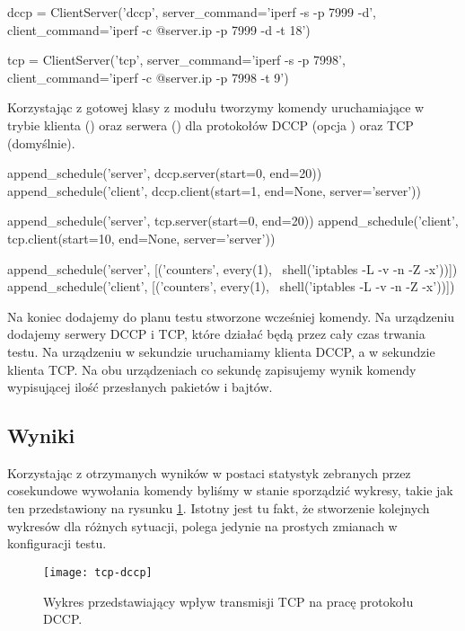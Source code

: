\documentclass[00-praca-magisterska.tex]{subfiles}
\begin{document}
\begin{pythoncode}
  dccp = ClientServer('dccp',
      server_command='iperf -s -p 7999 -d',
      client_command='iperf -c @{server.ip} -p 7999 -d -t 18')

  tcp = ClientServer('tcp',
      server_command='iperf -s -p 7998',
      client_command='iperf -c @{server.ip} -p 7998 -t 9')
\end{pythoncode}

Korzystając z gotowej klasy  z modułu  tworzymy
komendy uruchamiające  w trybie klienta () oraz serwera
() dla protokołów DCCP (opcja ) oraz TCP (domyślnie).

\begin{pythoncode}
  append_schedule('server', dccp.server(start=0, end=20))
  append_schedule('client', dccp.client(start=1, end=None, server='server'))

  append_schedule('server', tcp.server(start=0, end=20))
  append_schedule('client', tcp.client(start=10, end=None, server='server'))

  append_schedule('server', [('counters', every(1), \
      shell('iptables -L -v -n -Z -x'))])
  append_schedule('client', [('counters', every(1), \
      shell('iptables -L -v -n -Z -x'))])
\end{pythoncode}

Na koniec dodajemy do planu testu stworzone wcześniej komendy. Na urządzeniu
 dodajemy serwery DCCP i TCP, które działać będą przez cały czas
trwania testu. Na urządzeniu \code{client} w \code{1} sekundzie uruchamiamy
klienta DCCP, a w \code{10} sekundzie klienta TCP. Na obu urządzeniach co
sekundę zapisujemy wynik komendy wypisującej ilość przesłanych pakietów i
bajtów.

\subsection{Wyniki}

Korzystając z otrzymanych wyników w postaci statystyk zebranych
przez cosekundowe wywołania komendy  byliśmy w stanie sporządzić
wykresy, takie jak ten przedstawiony na rysunku \ref{fig:tcp-dccp}. Istotny jest
tu fakt, że stworzenie kolejnych wykresów dla różnych sytuacji, polega jedynie
na prostych zmianach w konfiguracji testu.

\begin{figure}[htb]
\begin{center}
\leavevmode
\texttt{[image: tcp-dccp]}
\end{center}
\caption{Wykres przedstawiający wpływ transmisji TCP na pracę
protokołu DCCP.}
\label{fig:tcp-dccp}
\end{figure}
\end{document}
